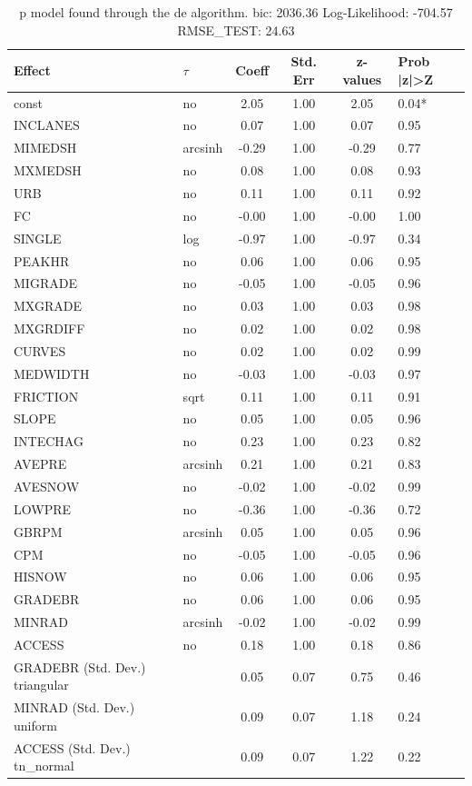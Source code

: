 \begin{table}
	\caption{p model found through the de algorithm. bic: 2036.36 Log-Likelihood: -704.57 RMSE_TEST: 24.63}
	\begin{center}
		\begin{tabular}{|l|l|c|c|c|l|}
			\hline
			Effect & $\tau$ & Coeff & Std. Err & z-values & Prob |z|>Z \\
			\hline
			const & no & 2.05 & 1.00 & 2.05 & 0.04* \\
			\hline
			INCLANES & no & 0.07 & 1.00 & 0.07 & 0.95 \\
			\hline
			MIMEDSH & arcsinh & -0.29 & 1.00 & -0.29 & 0.77 \\
			\hline
			MXMEDSH & no & 0.08 & 1.00 & 0.08 & 0.93 \\
			\hline
			URB & no & 0.11 & 1.00 & 0.11 & 0.92 \\
			\hline
			FC & no & -0.00 & 1.00 & -0.00 & 1.00 \\
			\hline
			SINGLE & log & -0.97 & 1.00 & -0.97 & 0.34 \\
			\hline
			PEAKHR & no & 0.06 & 1.00 & 0.06 & 0.95 \\
			\hline
			MIGRADE & no & -0.05 & 1.00 & -0.05 & 0.96 \\
			\hline
			MXGRADE & no & 0.03 & 1.00 & 0.03 & 0.98 \\
			\hline
			MXGRDIFF & no & 0.02 & 1.00 & 0.02 & 0.98 \\
			\hline
			CURVES & no & 0.02 & 1.00 & 0.02 & 0.99 \\
			\hline
			MEDWIDTH & no & -0.03 & 1.00 & -0.03 & 0.97 \\
			\hline
			FRICTION & sqrt & 0.11 & 1.00 & 0.11 & 0.91 \\
			\hline
			SLOPE & no & 0.05 & 1.00 & 0.05 & 0.96 \\
			\hline
			INTECHAG & no & 0.23 & 1.00 & 0.23 & 0.82 \\
			\hline
			AVEPRE & arcsinh & 0.21 & 1.00 & 0.21 & 0.83 \\
			\hline
			AVESNOW & no & -0.02 & 1.00 & -0.02 & 0.99 \\
			\hline
			LOWPRE & no & -0.36 & 1.00 & -0.36 & 0.72 \\
			\hline
			GBRPM & arcsinh & 0.05 & 1.00 & 0.05 & 0.96 \\
			\hline
			CPM & no & -0.05 & 1.00 & -0.05 & 0.96 \\
			\hline
			HISNOW & no & 0.06 & 1.00 & 0.06 & 0.95 \\
			\hline
			GRADEBR & no & 0.06 & 1.00 & 0.06 & 0.95 \\
			\hline
			MINRAD & arcsinh & -0.02 & 1.00 & -0.02 & 0.99 \\
			\hline
			ACCESS & no & 0.18 & 1.00 & 0.18 & 0.86 \\
			\hline
			GRADEBR (Std. Dev.) triangular &  & 0.05 & 0.07 & 0.75 & 0.46 \\
			\hline
			MINRAD (Std. Dev.) uniform &  & 0.09 & 0.07 & 1.18 & 0.24 \\
			\hline
			ACCESS (Std. Dev.) tn_normal &  & 0.09 & 0.07 & 1.22 & 0.22 \\
			\hline
		\end{tabular}
	\end{center}
\end{table}